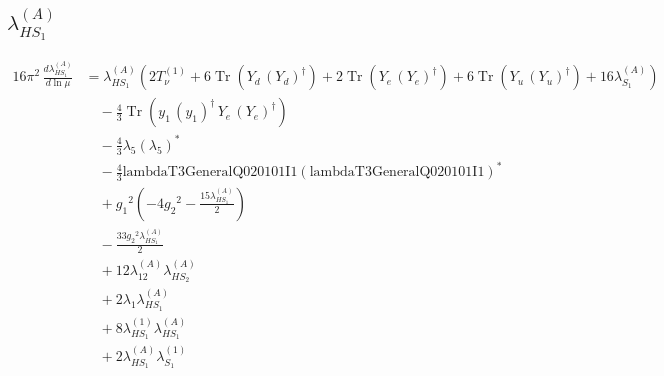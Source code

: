 \documentclass[10pt,a4paper]{article}
\begin{document}
\subsection*{$\lambda_{HS_1}^{(A)}$}
\begin{align*}
16\pi^2\,\frac{d \lambda_{HS_1}^{(A)}}{d\ln\mu} &={\lambda_{HS_1}^{(A)}} (2 T_{\nu}^{(1)}+6 \operatorname{Tr}\!\left({Y_d}\,\left({Y_d}\right)^{\dagger}\right)+2 \operatorname{Tr}\!\left({Y_e}\,\left({Y_e}\right)^{\dagger}\right)+6 \operatorname{Tr}\!\left({Y_u}\,\left({Y_u}\right)^{\dagger}\right)+16 {\lambda_{S_1}^{(A)}}) \\
&\quad -\frac{4}{3} \operatorname{Tr}\!\left({y_1}\,\left({y_1}\right)^{\dagger}\,{Y_e}\,\left({Y_e}\right)^{\dagger}\right) \\
&\quad -\frac{4}{3} {\lambda_5} \left({\lambda_5}\right)^{*} \\
&\quad -\frac{4}{3} \text{lambdaT3GeneralQ020101I1} \left(\text{lambdaT3GeneralQ020101I1}\right)^{*} \\
&\quad +{g_1}^2 \left(-4 {g_2}^2-\frac{15 {\lambda_{HS_1}^{(A)}}}{2}\right) \\
&\quad -\frac{33 {g_2}^2 {\lambda_{HS_1}^{(A)}}}{2} \\
&\quad +12 {\lambda_{12}^{(A)}} {\lambda_{HS_2}^{(A)}} \\
&\quad +2 {\lambda_1} {\lambda_{HS_1}^{(A)}} \\
&\quad +8 {\lambda_{HS_1}^{(1)}} {\lambda_{HS_1}^{(A)}} \\
&\quad +2 {\lambda_{HS_1}^{(A)}} {\lambda_{S_1}^{(1)}} \\
\end{align*}
\end{document}
